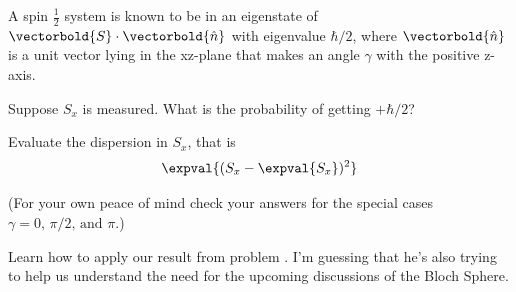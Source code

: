 \begin{question}

A spin $\frac 1 2$ system is known to be in an eigenstate of
$\vectorbold{S}\cdot\vectorbold{\hat{n}}$ with eigenvalue $\hbar/2$,
where $\vectorbold{\hat{n}}$ is a unit vector lying in the xz-plane
that makes an angle $\gamma$ with the positive z-axis.

\begin{questionpart}
  Suppose $S_x$ is measured. What is the probability of getting $+\hbar/2$?
\end{questionpart}

\begin{questionpart}
  Evaluate the dispersion in $S_x$, that is
  \begin{equation*}
    \expval{(S_x - \expval{S_x})^2}
  \end{equation*}
\end{questionpart}

(For your own peace of mind check your answers for the special cases
$\gamma = 0\text{, }\pi/2\text{, and }\pi.$)
\end{question}

\begin{purpose}
  Learn how to apply our result from problem .
  I'm guessing that he's also trying to help us understand the need
  for the upcoming discussions of the Bloch Sphere.
\end{purpose}

